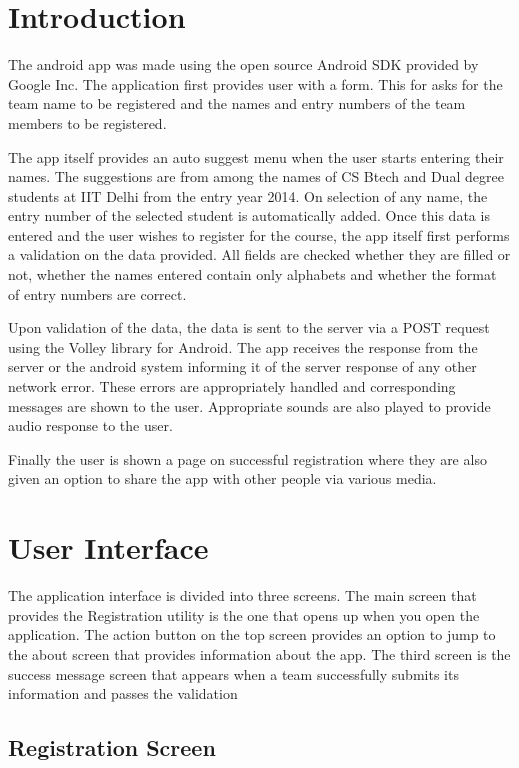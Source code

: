 \documentclass[12pt]{article}
\begin{document}
\section{Introduction}
The android app was made using the open source Android SDK provided by Google Inc. The application first provides user with a form. This for asks for the team name to be registered and the names and entry numbers of the team members to be registered.
\par
The app itself provides an auto suggest menu when the user starts entering their names. The suggestions are from among the names of CS Btech and Dual degree students at IIT Delhi from the entry year 2014. On selection of any name, the entry number of the selected student is automatically added. Once this data is entered and the user wishes to register for the course, the app itself first performs a validation on the data provided. All fields are checked whether they are filled or not, whether the names entered contain only alphabets and whether the format of entry numbers are correct.
\par
Upon validation of the data, the data is sent to the server via a POST request using the Volley library for Android. The app receives the response from the server or the android system informing it of the server response of any other network error. These errors are appropriately handled and corresponding messages are shown to the user. Appropriate sounds are also played to provide audio response to the user.
\par
Finally the user is shown a page on successful registration where they are also given an option to share the app with other people via various media.

\section{User Interface}
\par
The application interface is divided into three screens. The main screen that provides the Registration utility is the one that opens up when you open the application. The action button on the top screen provides an option to jump to the about screen that provides information about the app. The third screen is the success message screen that appears when a team successfully submits its information and passes the validation
\subsection{Registration Screen}
\end{document}
